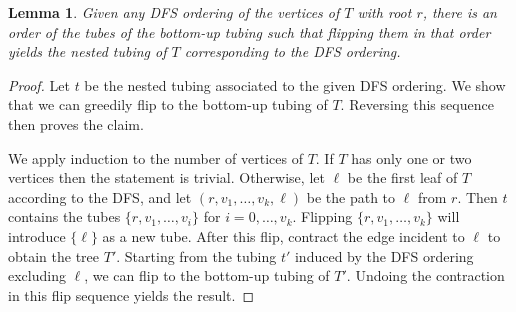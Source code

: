 \documentclass[fontsize=11pt,a4paper,DIV=12]{scrartcl}
\newtheorem{lemma}[theorem]{Lemma}
\begin{document}
\begin{lemma}\label{lem:bottom-up}
    Given any DFS ordering of the vertices of $T$ with root $r$, there is an order of the tubes of the bottom-up tubing such that flipping them in that order yields the nested tubing of $T$ corresponding to the DFS ordering.
\end{lemma}
\begin{proof}
    Let $t$ be the nested tubing associated to the given DFS ordering. We show that we can greedily flip to the bottom-up tubing of $T$. Reversing this sequence then proves the claim. 

    We apply induction to the number of vertices of $T$. If $T$ has only one or two vertices then the statement is trivial. Otherwise, let $\ell$ be the first leaf of $T$ according to the DFS, and let $(r,v_1,\ldots,v_k,\ell)$ be the path to $\ell$ from $r$. Then $t$ contains the tubes $\{r,v_1,\ldots,v_i\}$ for $i=0,\ldots,v_k$. Flipping $\{r,v_1,\ldots,v_k\}$ will introduce $\{\ell\}$ as a new tube. After this flip, contract the edge incident to $\ell$ to obtain the tree $T'$. Starting from the tubing $t'$ induced by the DFS ordering excluding $\ell$, we can flip to the bottom-up tubing of $T'$. Undoing the contraction in this flip sequence yields the result.
\end{proof}
\end{document}
